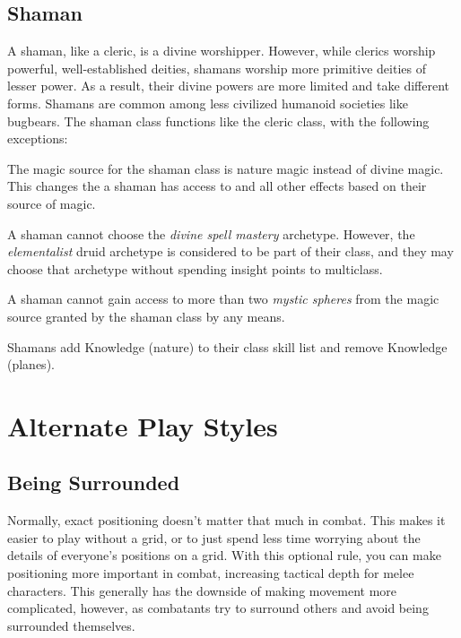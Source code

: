  \subsection{Shaman}
    A shaman, like a cleric, is a divine worshipper.
    However, while clerics worship powerful, well-established deities, shamans worship more primitive deities of lesser power.
    As a result, their divine powers are more limited and take different forms.
    Shamans are common among less civilized humanoid societies like bugbears.
    The shaman class functions like the cleric class, with the following exceptions:
    \begin{raggeditemize}
      \item The magic source for the shaman class is nature magic instead of divine magic.
        This changes the  a shaman has access to and all other effects based on their source of magic.
      \item A shaman cannot choose the \textit{divine spell mastery} archetype. However, the \textit{elementalist} druid archetype is considered to be part of their class, and they may choose that archetype without spending insight points to multiclass.
      \item A shaman cannot gain access to more than two \textit{mystic spheres} from the magic source granted by the shaman class by any means.
      \item Shamans add Knowledge (nature) to their class skill list and remove Knowledge (planes).
    \end{raggeditemize}

\section{Alternate Play Styles}

  \subsection{Being Surrounded}\label{Being Surrounded}
    Normally, exact positioning doesn't matter that much in combat.
    This makes it easier to play without a grid, or to just spend less time worrying about the details of everyone's positions on a grid.
    With this optional rule, you can make positioning more important in combat, increasing tactical depth for melee characters.
    This generally has the downside of making movement more complicated, however, as combatants try to surround others and avoid being surrounded themselves.


